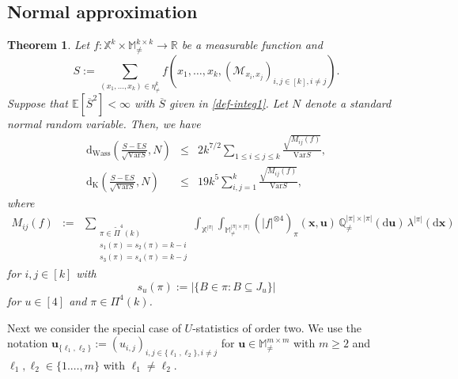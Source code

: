 \documentclass{article}
\newtheorem{theorem}{Theorem}[section]
\theoremstyle{definition}
\numberwithin{equation}{section}
\theoremstyle{remark}
\newcommand{\E}{\mathbb{E}}
\newcommand{\Var}{\mathrm{Var}}
\newcommand{\supp}{\mathrm{Supp}}
\begin{document}
\subsection{Normal approximation}
\begin{theorem}\label{normalapp1}
Let $f: \mathbb{X}^k\times \mathbb{M}^{k\times k}_{\neq}\to\mathbb{R}$ be a measurable function 
and 
$$S:=\sum_{(x_1,\ldots,x_k)\in\eta^k_{\neq}} f(x_1,\ldots,x_k, (\mathcal{M}_{x_i,x_j})_{i,j\in[k], i\neq j}).$$ 
Suppose that $\E[\overline{S}^2]<\infty$ with $\overline{S}$ given in \eqref{def-integ1}. Let $N$ denote a standard normal random variable.
Then, we have
\begin{eqnarray}
	\mathrm{d}_{\mathrm{Wass}}\left(\frac{S-\E S}{\sqrt{\Var S}},N\right)&\le&2k^{7/2}\sum_{1\le i\le j\le k}\frac{\sqrt{M_{ij}(f)}}{\Var S},\label{norbound-1}\\
	\mathrm{d}_{\mathrm{K}}\left(\frac{S-\E S}{\sqrt{\Var S}},N\right)&\le&19k^5\sum_{i,j=1}^k\frac{\sqrt{M_{ij}(f)}}{\Var S},\label{norbound-2}
\end{eqnarray}
where 
\begin{eqnarray*}
    M_{ij}(f)&:=&\sum_{\substack{\pi\in\widetilde{\Pi}^4(k)\\s_1(\pi)=s_2(\pi)=k-i\\s_3(\pi)=s_4(\pi)=k-j}}\int_{\mathbb{X}^{|\pi|}} \int_{\mathbb{M}^{|\pi|\times |\pi|}_{\neq}} \left(|f|^{\otimes 4}\right)_{\pi}(\bm{x},\bm{u}) \, \mathbb{Q}_{\neq}^{|\pi|\times |\pi|}(\mathrm{d}\bm{u}) \, \lambda^{|\pi|}(\mathrm{d}\bm{x})
\end{eqnarray*}
for $i,j\in[k]$ with %
$$s_u(\pi):=|\{B\in\pi:B\subseteq J_u\}|$$
for $u\in[4]$ and $\pi\in\Pi^4(k)$.
\end{theorem}

Next we consider the special case of $U$-statistics of order two. We use the notation $\mathbf{u}_{\{\ell_1,\ell_2\}}:=(u_{i,j})_{i,j\in\{\ell_1,\ell_2\}, i\neq j}$ for $\mathbf{u}\in\mathbb{M}^{m\times m}_{\neq}$ with $m\geq 2$ and $\ell_1,\ell_2\in\{1.\ldots,m\}$ with $\ell_1\neq \ell_2$.
\end{document}

